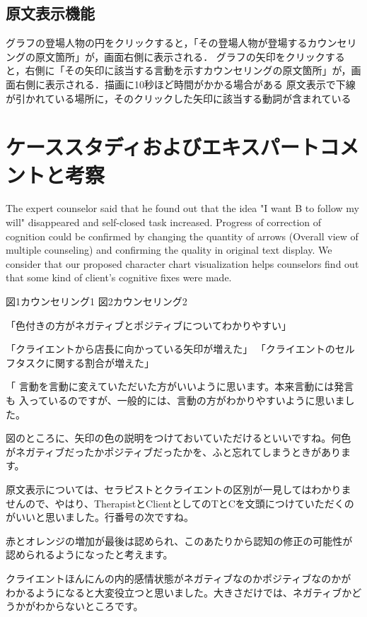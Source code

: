 \documentclass[shuuron]{kuee}
\begin{document}
\subsection{原文表示機能}

グラフの登場人物の円をクリックすると，「その登場人物が登場するカウンセリングの原文箇所」が，画面右側に表示される．
グラフの矢印をクリックすると，右側に「その矢印に該当する言動を示すカウンセリングの原文箇所」が，画面右側に表示される．描画に10秒ほど時間がかかる場合がある
原文表示で下線が引かれている場所に，そのクリックした矢印に該当する動詞が含まれている




\section{ケーススタディおよびエキスパートコメントと考察}

  The expert counselor said that he found out that the idea "I want B to follow my will" disappeared and self-closed task increased. Progress of correction of cognition could be confirmed by changing the quantity of arrows (Overall view of multiple counseling) and confirming the quality in original text display. We consider that our proposed character chart visualization helps counselors find out that some kind of client's cognitive fixes were made.

  図1カウンセリング1
  図2カウンセリング2

  「色付きの方がネガティブとポジティブについてわかりやすい」

  「クライエントから店長に向かっている矢印が増えた」
  「クライエントのセルフタスクに関する割合が増えた」

  「
言動を言動に変えていただいた方がいいように思います。本来言動には発言も
入っているのですが、一般的には、言動の方がわかりやすいように思いました。

図のところに、矢印の色の説明をつけておいていただけるといいですね。何色
がネガティブだったかポジティブだったかを、ふと忘れてしまうときがあります。

原文表示については、セラピストとクライエントの区別が一見してはわかりま
せんので、やはり、TherapistとClientとしてのTとCを文頭につけていただくの
がいいと思いました。行番号の次ですね。

赤とオレンジの増加が最後は認められ、このあたりから認知の修正の可能性が
認められるようになったと考えます。

クライエントほんにんの内的感情状態がネガティブなのかポジティブなのかが
わかるようになると大変役立つと思いました。大きさだけでは、ネガティブかど
うかがわからないところです。
\end{document}

